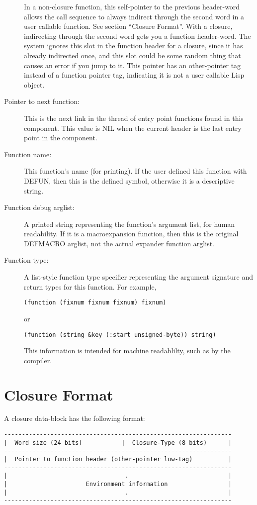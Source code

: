 \begin{description}
      In a non-closure function, this self-pointer to the previous header-word
      allows the call sequence to always indirect through the second word in a
      user callable function.  See section ``Closure Format''.  With a closure,
      indirecting through the second word gets you a function header-word.  The
      system ignores this slot in the function header for a closure, since it
      has already indirected once, and this slot could be some random thing
      that causes an error if you jump to it.  This pointer has an
      other-pointer tag instead of a function pointer tag, indicating it is not
      a user callable Lisp object.
   \item[Pointer to next function:]
      This is the next link in the thread of entry point functions found in
      this component.  This value is NIL when the current header is the last
      entry point in the component.
   \item[Function name:]
      This function's name (for printing).  If the user defined this function
      with DEFUN, then this is the defined symbol, otherwise it is a
      descriptive string.
   \item[Function debug arglist:]
      A printed string representing the function's argument list, for human
      readability.  If it is a macroexpansion function, then this is the
      original DEFMACRO arglist, not the actual expander function arglist.
   \item[Function type:]
      A list-style function type specifier representing the argument signature
      and return types for this function.  For example,
      \begin{verbatim}
(function (fixnum fixnum fixnum) fixnum)
      \end{verbatim}
      or
      \begin{verbatim}
(function (string &key (:start unsigned-byte)) string)
      \end{verbatim}
      This information is intended for machine readablilty, such as by the
      compiler.
\end{description}


\section{Closure Format}

A closure data-block has the following format:
\begin{verbatim}
----------------------------------------------------------------
|  Word size (24 bits)           |  Closure-Type (8 bits)      |
----------------------------------------------------------------
|  Pointer to function header (other-pointer low-tag)          |
----------------------------------------------------------------
|                                 .                            |
|                      Environment information                 |
|                                 .                            |
----------------------------------------------------------------
\end{verbatim}

